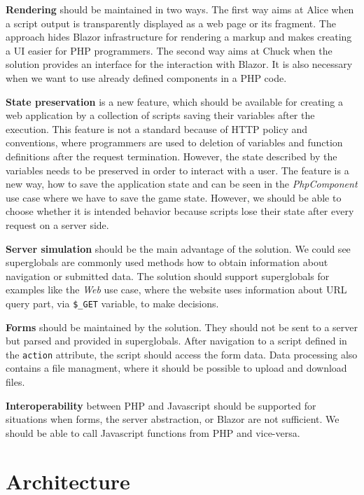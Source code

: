 \par
\textbf{Rendering} should be maintained in two ways.
The first way aims at Alice when a script output is transparently displayed as a web page or its fragment.
The approach hides Blazor infrastructure for rendering a markup and makes creating a UI easier for PHP programmers.
The second way aims at Chuck when the solution provides an interface for the interaction with Blazor.
It is also necessary when we want to use already defined components in a PHP code.
\par
\textbf{State preservation} is a new feature, which should be available for creating a web application by a collection of scripts saving their variables after the execution.
This feature is not a standard because of HTTP policy and conventions, where programmers are used to deletion of variables and function definitions after the request termination.
However, the state described by the variables needs to be preserved in order to interact with a user.
The feature is a new way, how to save the application state and can be seen in the \textit{PhpComponent} use case where we have to save the game state.
However, we should be able to choose whether it is intended behavior because scripts lose their state after every request on a server side.
\par
\textbf{Server simulation} should be the main advantage of the solution.
We could see superglobals are commonly used methods how to obtain information about navigation or submitted data.
The solution should support superglobals for examples like the \textit{Web} use case, where the website uses information about URL query part, via \texttt{\$\_GET} variable, to make decisions.
\par
\textbf{Forms} should be maintained by the solution. 
They should not be sent to a server but parsed and provided in superglobals. 
After navigation to a script defined in the \texttt{action} attribute, the script should access the form data.
Data processing also contains a file managment, where it should be possible to upload and download files.
\par
\textbf{Interoperability} between PHP and Javascript should be supported for situations when forms, the server abstraction, or Blazor are not sufficient.
We should be able to call Javascript functions from PHP and vice-versa.

\section{Architecture}

